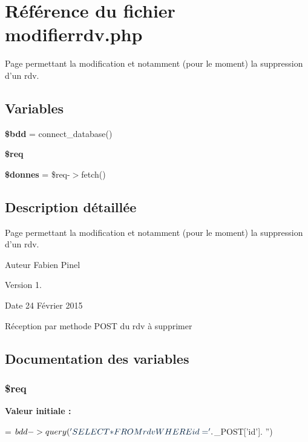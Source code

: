 \hypertarget{modifierrdv_8php}{\section{Référence du fichier modifierrdv.\-php}
\label{modifierrdv_8php}
}


Page permettant la modification et notamment (pour le moment) la suppression d'un rdv.  


\subsection*{Variables}
\begin{DoxyCompactItemize}
\item 
\hypertarget{modifierrdv_8php_a94f91e878bce0991e2cd595c5dd79b3f}{{\bfseries \$bdd} = connect\-\_\-database()}\label{modifierrdv_8php_a94f91e878bce0991e2cd595c5dd79b3f}

\item 
{\bfseries \$req}
\item 
\hypertarget{modifierrdv_8php_a93720f3d7a3eb4aabe4bb2053895b6b6}{{\bfseries \$donnes} = \$req-\/$>$fetch()}\label{modifierrdv_8php_a93720f3d7a3eb4aabe4bb2053895b6b6}

\end{DoxyCompactItemize}


\subsection{Description détaillée}
Page permettant la modification et notamment (pour le moment) la suppression d'un rdv. \begin{DoxyAuthor}{Auteur}
Fabien Pinel 
\end{DoxyAuthor}
\begin{DoxyVersion}{Version}
1. 
\end{DoxyVersion}
\begin{DoxyDate}{Date}
24 Février 2015
\end{DoxyDate}
Réception par methode P\-O\-S\-T du rdv à supprimer 

\subsection{Documentation des variables}
\hypertarget{modifierrdv_8php_a63a7a283ea5dee8af1e2d5a3435bf370}{
\subsubsection[{\$req}]{\setlength{\rightskip}{0pt plus 5cm}\$req}}\label{modifierrdv_8php_a63a7a283ea5dee8af1e2d5a3435bf370}
{\bfseries Valeur initiale \-:}
\begin{DoxyCode}
= $bdd->query(\textcolor{stringliteral}{' SELECT *  }
\textcolor{stringliteral}{            FROM rdv}
\textcolor{stringliteral}{            WHERE id = '} .$\_POST[\textcolor{stringliteral}{'id'}]. \textcolor{stringliteral}{''})
\end{DoxyCode}
